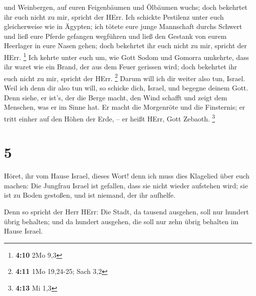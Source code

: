 und Weinbergen, auf euren Feigenbäumen und Ölbäumen wuchs; doch
bekehrtet ihr euch nicht zu mir, spricht der HErr.  Ich
schickte Pestilenz unter euch gleicherweise wie in Ägypten; ich tötete
eure junge Mannschaft durchs Schwert und ließ eure Pferde gefangen
wegführen und ließ den Gestank von eurem Heerlager in eure Nasen gehen;
doch bekehrtet ihr euch nicht zu mir, spricht der HErr. \footnote{\textbf{4:10}
  2Mo 9,3}  Ich kehrte unter euch um, wie Gott Sodom und
Gomorra umkehrte, dass ihr waret wie ein Brand, der aus dem Feuer
gerissen wird; doch bekehrtet ihr euch nicht zu mir, spricht der HErr.
\footnote{\textbf{4:11} 1Mo 19,24-25; Sach 3,2}  Darum will
ich dir weiter also tun, Israel. Weil ich denn dir also tun will, so
schicke dich, Israel, und begegne deinem Gott.  Denn siehe,
er ist's, der die Berge macht, den Wind schafft und zeigt dem Menschen,
was er im Sinne hat. Er macht die Morgenröte und die Finsternis; er
tritt einher auf den Höhen der Erde, -- er heißt HErr, Gott Zebaoth.
\footnote{\textbf{4:13} Mi 1,3}

\hypertarget{section-1}{%
\section{5}\label{section-1}}

 Höret, ihr vom Hause Israel, dieses Wort! denn ich muss
dies Klagelied über euch machen:  Die Jungfrau Israel ist
gefallen, dass sie nicht wieder aufstehen wird; sie ist zu Boden
gestoßen, und ist niemand, der ihr aufhelfe.

 Denn so spricht der Herr HErr: Die Stadt, da tausend
ausgehen, soll nur hundert übrig behalten; und da hundert ausgehen, die
soll nur zehn übrig behalten im Hause Israel.

